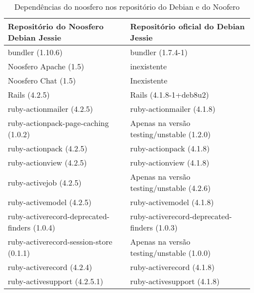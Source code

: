 \begin{anexosenv}
\begin{longtable}[H]{l|l}
				\caption{Dependências do noosfero nos repositório do Debian e do Noofero}\\
        \hline
        Repositório do Noosfero Debian Jessie & Repositório oficial do Debian Jessie                   \\ \hline
        bundler (1.10.6)                                 & bundler (1.7.4-1)                                                 \\ 
        Noosfero Apache (1.5)                            & inexistente                                                       \\ 
        Noosfero Chat (1.5)                              & Inexistente                                                       \\ 
        Rails (4.2.5)                                    & Rails (4.1.8-1+deb8u2)                                            \\ 
        ruby-actionmailer (4.2.5)                        & ruby-actionmailer (4.1.8)                                         \\ 
        ruby-actionpack-page-caching (1.0.2)             & Apenas na versão testing/unstable (1.2.0)  \\ 
        ruby-actionpack (4.2.5)                          & ruby-actionpack (4.1.8)                                           \\ 
        ruby-actionview (4.2.5)                          & ruby-actionview (4.1.8)                                           \\ 
         ruby-activejob (4.2.5)                          & Apenas na versão testing/unstable (4.2.6)  \\ 
        ruby-activemodel (4.2.5)                         & ruby-activemodel (4.1.8)                                          \\ 
        ruby-activerecord-deprecated-finders (1.0.4)     & ruby-activerecord-deprecated-finders (1.0.3)                      \\ 
        ruby-activerecord-session-store (0.1.1)          & Apenas na versão testing/unstable (1.0.0)  \\ 
        ruby-activerecord (4.2.4)                        & ruby-activerecord (4.1.8)                                         \\ 
        ruby-activesupport (4.2.5.1)                     & ruby-activesupport (4.1.8)                                        \\ 

\end{longtable}
\end{anexosenv}

